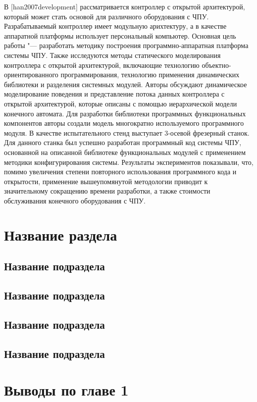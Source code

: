 В [han2007development] рассматривается контроллер с открытой архитектурой, который может стать основой для различного оборудования с ЧПУ. Разрабатываемый контроллер имеет модульную арихтектуру, а в качестве аппаратной платформы использует персональный компьютер. Основная цель работы "--- разработать методику построения программно-аппаратная платформа системы ЧПУ. Также исследуются методы статического моделирования контроллера с открытой архитектурой, включающие технологию объектно-ориентированного программирования, технологию применения динамических библиотеки и разделения системных модулей. Авторы обсуждают динамическое моделирование поведения и представление потока данных контроллера с открытой архитектурой, которые описаны с помощью иерархической модели конечного автомата. Для разработки библиотеки программных функциональных компонентов авторы создали модель многократно используемого программного модуля. В качестве испытательного стенд выступает 3-осевой фрезерный станок. Для данного станка был успешно разработан программный код системы ЧПУ, основанной на описанной библиотеке функциональных модулей с применением методики конфигурирования системы. Результаты экспериментов показывали, что, помимо увеличения степени повторного использования программного кода и открытости, применение вышеупомянутой методологии приводит к значительному сокращению времени разработки, а также стоимости обслуживания конечного оборудования с ЧПУ.


\section{Название раздела}\label{sec:ch1/sec3}

\subsection{Название подраздела}\label{subsec:ch1/sec3/sub1}

\subsection{Название подраздела}\label{subsec:ch1/sec3/sub2}

\subsection{Название подраздела}\label{subsec:ch1/sec3/sub3}

\subsection{Название подраздела}\label{subsec:ch1/sec3/sub4}

\section{Выводы по главе 1}

\FloatBarrier
